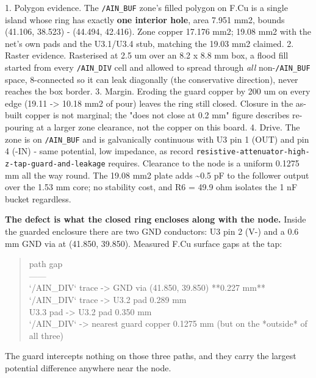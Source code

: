 \documentclass[11pt,a4paper]{article}
\begin{document}
1. Polygon evidence. The \texttt{/AIN\_BUF} zone's filled polygon on F.Cu is a single island whose ring has exactly \textbf{one interior hole}, area 7.951 mm2, bounds (41.106, 38.523) - (44.494, 42.416). Zone copper 17.176 mm2; 19.08 mm2 with the net's own pads and the U3.1/U3.4 stub, matching the 19.03 mm2 claimed. 2. Raster evidence. Rasterised at 2.5 um over an 8.2 x 8.8 mm box, a flood fill started from every \texttt{/AIN\_DIV} cell and allowed to spread through \emph{all} non-\texttt{/AIN\_BUF} space, 8-connected so it can leak diagonally (the conservative direction), never reaches the box border. 3. Margin. Eroding the guard copper by 200 um on every edge (19.11 -\textgreater{} 10.18 mm2 of pour) leaves the ring still closed. Closure in the as-built copper is not marginal; the "does not close at 0.2 mm" figure describes re-pouring at a larger zone clearance, not the copper on this board. 4. Drive. The zone is on \texttt{/AIN\_BUF} and is galvanically continuous with U3 pin 1 (OUT) and pin 4 (-IN) - same potential, low impedance, as record \texttt{resistive-attenuator-high-z-tap-guard-and-leakage} requires. Clearance to the node is a uniform 0.1275 mm all the way round. The 19.08 mm2 plate adds \textasciitilde{}0.5 pF to the follower output over the 1.53 mm core; no stability cost, and R6 = 49.9 ohm isolates the 1 nF bucket regardless.

\textbf{The defect is what the closed ring encloses along with the node.} Inside the guarded enclosure there are two GND conductors: U3 pin 2 (V-) and a 0.6 mm GND via at (41.850, 39.850). Measured F.Cu surface gaps at the tap:

\begin{quote}\small\ttfamily\raggedright
\textbar{} path \textbar{} gap \textbar{}\\
\textbar{}---\textbar{}---\textbar{}\\
\textbar{} `/AIN\_DIV` trace -\textgreater{} GND via (41.850, 39.850) \textbar{} {*}{*}0.227 mm{*}{*} \textbar{}\\
\textbar{} `/AIN\_DIV` trace -\textgreater{} U3.2 pad \textbar{} 0.289 mm \textbar{}\\
\textbar{} U3.3 pad -\textgreater{} U3.2 pad \textbar{} 0.350 mm \textbar{}\\
\textbar{} `/AIN\_DIV` -\textgreater{} nearest guard copper \textbar{} 0.1275 mm (but on the {*}outside{*} of all three) \textbar{}
\end{quote}
The guard intercepts nothing on those three paths, and they carry the largest potential difference anywhere near the node.
\end{document}
